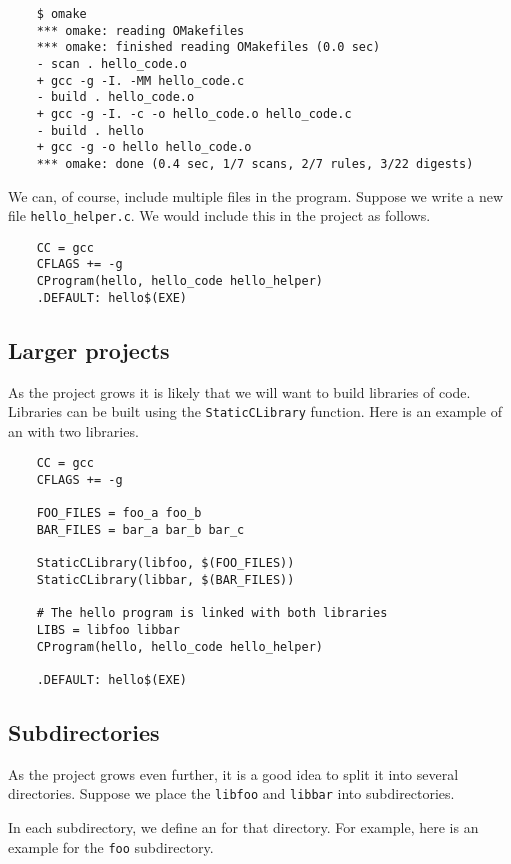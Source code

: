 \begin{verbatim}
    $ omake
    *** omake: reading OMakefiles
    *** omake: finished reading OMakefiles (0.0 sec)
    - scan . hello_code.o
    + gcc -g -I. -MM hello_code.c
    - build . hello_code.o
    + gcc -g -I. -c -o hello_code.o hello_code.c
    - build . hello
    + gcc -g -o hello hello_code.o
    *** omake: done (0.4 sec, 1/7 scans, 2/7 rules, 3/22 digests)
\end{verbatim}

We can, of course, include multiple files in the program.  Suppose we write a new
file \verb+hello_helper.c+.  We would include this in the project as follows.

\begin{verbatim}
    CC = gcc
    CFLAGS += -g
    CProgram(hello, hello_code hello_helper)
    .DEFAULT: hello$(EXE)
\end{verbatim}

\subsection{Larger projects}

As the project grows it is likely that we will want to build libraries of code.
Libraries can be built using the \verb+StaticCLibrary+ function.  Here is an example
of an  with two libraries.

\begin{verbatim}
    CC = gcc
    CFLAGS += -g

    FOO_FILES = foo_a foo_b
    BAR_FILES = bar_a bar_b bar_c

    StaticCLibrary(libfoo, $(FOO_FILES))
    StaticCLibrary(libbar, $(BAR_FILES))

    # The hello program is linked with both libraries
    LIBS = libfoo libbar
    CProgram(hello, hello_code hello_helper)

    .DEFAULT: hello$(EXE)
\end{verbatim}

\subsection{Subdirectories}

As the project grows even further, it is a good idea to split it into several directories.
Suppose we place the \verb+libfoo+ and \verb+libbar+ into subdirectories.

In each subdirectory, we define an  for that directory.  For example, here
is an example  for the \verb+foo+ subdirectory.

